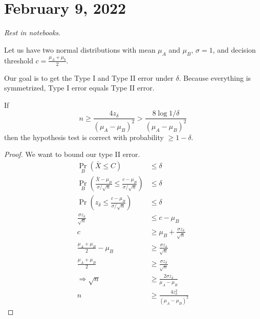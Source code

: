 \section{February 9, 2022}
\emph{Rest in notebooks}.

Let us have two normal distributions with mean $\mu_A$ and $\mu_B$, $\sigma = 1$, and decision threshold $c = \frac{\mu_A + \mu_b}{2}$.

Our goal is to get the Type I and Type II error under $\delta$. Because everything is symmetrized, Type I error equals Type II error.

\begin{theorem}
    If \[ n \geq \frac{4z_{\delta}}{(\mu_A - \mu_B)^2} > \frac{8\log{1/\delta}}{(\mu_A - \mu_B)^2}\]
    then the hypothesis test is correct with probability $\geq 1 - \delta$.
\end{theorem}

\begin{proof}
    We want to bound our type II error.
    \begin{align*}
        \Pr_B(\bar{X} \leq C)                                                                                  & \leq \delta                                   \\
        \Pr_B\left( \frac{\bar{X} - \mu_B}{\sigma / \sqrt{n}} \leq \frac{c - \mu_B}{\sigma / \sqrt{n}} \right) & \leq \delta                                   \\
        \Pr\left( z_\delta \leq \frac{c - \mu_B}{\sigma / \sqrt{n}} \right)                                    & \leq \delta                                   \\
        \frac{\sigma z_\delta}{\sqrt{n}}                                                                       & \leq c - \mu_B                                \\
        c                                                                                                      & \geq \mu_B + \frac{\sigma z_\delta}{\sqrt{n}} \\
        \frac{\mu_A + \mu_B}{2}- \mu_B                                                                         & \geq \frac{\sigma z_\delta}{\sqrt{n}}         \\
        \frac{\mu_A + \mu_B}{2}                                                                                & \geq \frac{\sigma z_\delta}{\sqrt{n}}         \\
        \Rightarrow \sqrt{n}                                                                                   & \geq \frac{2\sigma z_\delta}{\mu_A - \mu_B}   \\
        n                                                                                                      & \geq \frac{4 z_\delta^2}{(\mu_A - \mu_B)^2}
    \end{align*}
\end{proof}

